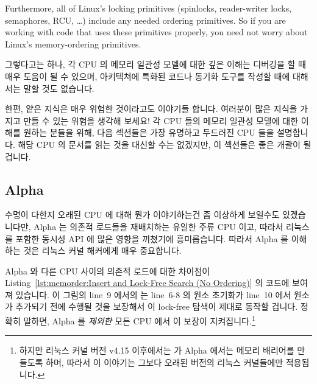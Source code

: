Furthermore,
all of Linux's locking primitives (spinlocks, reader-writer locks,
semaphores, RCU, \ldots) include any needed ordering primitives.
So if you are working with code that uses these primitives properly,
you need not worry about Linux's memory-ordering primitives.
\fi

그렇다고는 하나, 각 CPU 의 메모리 일관성 모델에 대한 깊은 이해는 디버깅을 할 때
매우 도움이 될 수 있으며, 아키텍쳐에 특화된 코드나 동기화 도구를 작성할 때에
대해서는 말할 것도 없습니다.

한편, 얕은 지식은 매우 위험한 것이라고도 이야기들 합니다.
여러분이 많은 지식을 가지고 만들 수 있는 위험을 생각해 보세요!
각 CPU 들의 메모리 일관성 모델에 대한 이해를 원하는 분들을 위해, 다음 섹션들은
가장 유명하고 두드러진 CPU 들을 설명합니다.
해당 CPU 의 문서를 읽는 것을 대신할 수는 없겠지만, 이 섹션들은 좋은 개괄이 될
겁니다.

\subsection{Alpha}
\label{sec:memorder:Alpha}

수명이 다한지 오래된 CPU 에 대해 뭔가 이야기하는건 좀 이상하게 보일수도
있겠습니다만, Alpha 는 의존적 로드들을 재배치하는 유일한 주류 CPU 이고, 따라서
리눅스를 포함한 동시성 API 에 많은 영향을 끼쳤기에 흥미롭습니다.
따라서 Alpha 를 이해하는 것은 리눅스 커널 해커에게 매우 중요합니다.

Alpha 와 다른 CPU 사이의 의존적 로드에 대한 차이점이
Listing~\ref{lst:memorder:Insert and Lock-Free Search (No Ordering)}
의 코드에 보여져 있습니다.
이 그림의 line~9 에서의  는 line~6-8 의 원소 초기화가 line~10
에서 원소가 추가되기 전에 수행될 것을 보장해서 이 lock-free 탐색이 제대로
동작할 겁니다.
정확히 말하면, Alpha 를 {\em 제외한} 모든 CPU 에서 이 보장이
지켜집니다.\footnote{
	하지만 리눅스 커널 버전 v4.15 이후에서는  가 Alpha
	에서는 메모리 배리어를 만들도록 하며, 따라서 이 이야기는 그보다 오래된
	버전의 리눅스 커널들에만 적용됩니다.}
\iffalse


